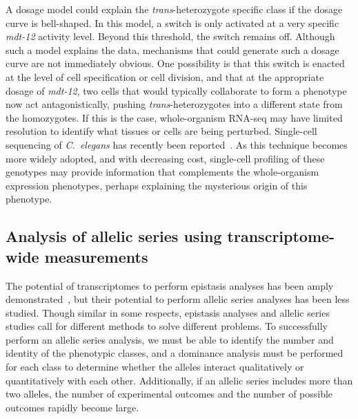 \documentclass[10pt, twocolumn]{article}
\newcommand{\cel}{\emph{C.~elegans}}
\newcommand{\gene}[1]{\mbox{\emph{#1}}}
\newcommand{\dpy}{\gene{mdt-12}}
\begin{document}
A dosage model could explain the \emph{trans}-heterozygote specific class if the
dosage curve is bell-shaped. In this model, a switch is only activated at a very
specific \dpy{} activity level. Beyond this threshold, the switch remains off.
Although such a model explains the data, mechanisms that could generate such a
dosage curve are not immediately obvious. One possibility is that this switch is
enacted at the level of cell specification or cell division, and that at the
appropriate dosage of \dpy{}, two cells that would typically collaborate to form
a phenotype now act antagonistically, pushing \emph{trans}-heterozygotes into a
different state from the homozygotes. If this is the case, whole-organism
RNA-seq may have limited resolution to identify what tissues or cells are being
perturbed. Single-cell sequencing of \cel{} has recently been
reported~\cite{Cao2017}. As this technique becomes more widely adopted, and with
decreasing cost, single-cell profiling of these genotypes may provide
information that complements the whole-organism expression phenotypes, perhaps
explaining the mysterious origin of this phenotype.

\subsection*{Analysis of allelic series using transcriptome-wide measurements}
The potential of transcriptomes to perform epistasis analyses has been amply
demonstrated~\cite{Dixit2016,Angeles-Albores2017}, but their potential to
perform allelic series analyses has been less studied. Though similar in some
respects, epistasis analyses and allelic series studies call for different
methods to solve different problems. To successfully perform an allelic series
analysis, we must be able to identify the number and identity of the phenotypic
classes, and a dominance analysis must be performed for each class to determine
whether the alleles interact qualitatively or quantitatively with each other.
Additionally, if an allelic series includes more than two alleles, the number of
experimental outcomes and the number of possible outcomes rapidly become large.
\end{document}
